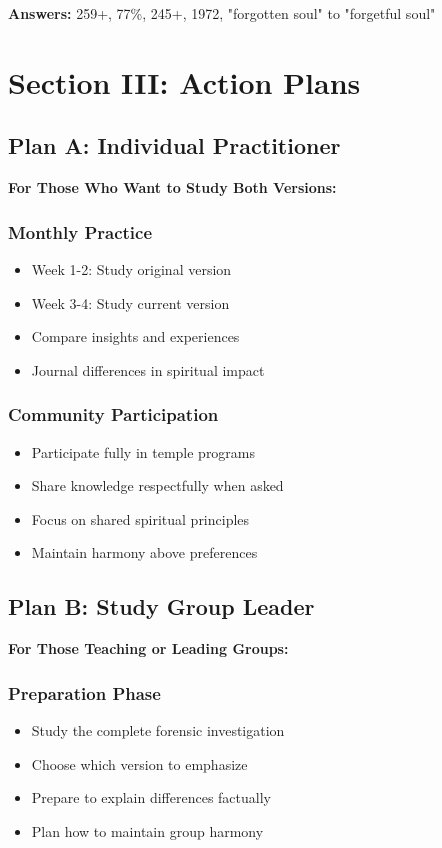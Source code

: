 \documentclass[11pt,twoside]{book}
\begin{document}
\textbf{Answers:} 259+, 77\%, 245+, 1972, "forgotten soul" to "forgetful soul"

\section*{Section III: Action Plans}
\label{sec:orgactionplans}

\subsection*{Plan A: Individual Practitioner}
\label{sec:orgindividual}

\textbf{For Those Who Want to Study Both Versions:}

\subsubsection*{Monthly Practice}
\label{sec:orgmonthly}
\begin{itemize}
\item Week 1-2: Study original version
\item Week 3-4: Study current version
\item Compare insights and experiences
\item Journal differences in spiritual impact
\end{itemize}

\subsubsection*{Community Participation}
\label{sec:orgcommunity}
\begin{itemize}
\item Participate fully in temple programs
\item Share knowledge respectfully when asked
\item Focus on shared spiritual principles
\item Maintain harmony above preferences
\end{itemize}

\subsection*{Plan B: Study Group Leader}
\label{sec:orgstudyleader}

\textbf{For Those Teaching or Leading Groups:}

\subsubsection*{Preparation Phase}
\label{sec:orgprep}
\begin{itemize}
\item Study the complete forensic investigation
\item Choose which version to emphasize
\item Prepare to explain differences factually
\item Plan how to maintain group harmony
\end{itemize}
\end{document}
